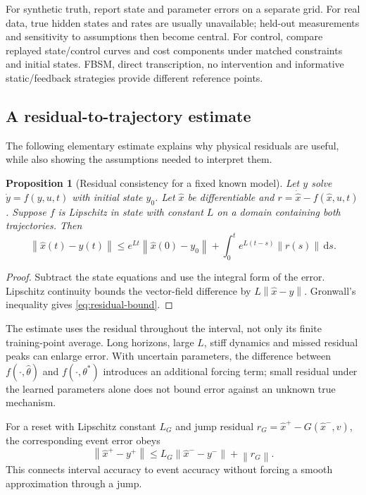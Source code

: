 \documentclass[11pt,a4paper]{article}
\newcommand{\dd}{\,\mathrm{d}}
\newcommand{\norm}[1]{\left\lVert#1\right\rVert}
\newtheorem{proposition}{Proposition}[section]
\theoremstyle{definition}
\theoremstyle{remark}
\begin{document}
For synthetic truth, report state and parameter errors on a separate grid. For real data, true hidden states and rates are usually unavailable; held-out measurements and sensitivity to assumptions then become central. For control, compare replayed state/control curves and cost components under matched constraints and initial states. FBSM, direct transcription, no intervention and informative static/feedback strategies provide different reference points.

\subsection{A residual-to-trajectory estimate}
The following elementary estimate explains why physical residuals are useful, while also showing the assumptions needed to interpret them.
\begin{proposition}[Residual consistency for a fixed known model]
Let $y$ solve $\dot y=f(y,u,t)$ with initial state $y_0$. Let $\hat x$ be differentiable and $r=\dot{\hat x}-f(\hat x,u,t)$. Suppose $f$ is Lipschitz in state with constant $L$ on a domain containing both trajectories. Then
\begin{equation}
\norm{\hat x(t)-y(t)}\le e^{Lt}\norm{\hat x(0)-y_0}
+\int_0^t e^{L(t-s)}\norm{r(s)}\dd s.
\label{eq:residual-bound}
\end{equation}
\end{proposition}
\begin{proof}
Subtract the state equations and use the integral form of the error. Lipschitz continuity bounds the vector-field difference by $L\norm{\hat x-y}$. Gronwall's inequality gives \eqref{eq:residual-bound}.
\end{proof}
The estimate uses the residual throughout the interval, not only its finite training-point average. Long horizons, large $L$, stiff dynamics and missed residual peaks can enlarge error. With uncertain parameters, the difference between $f(\cdot,\hat\theta)$ and $f(\cdot,\theta^*)$ introduces an additional forcing term; small residual under the learned parameters alone does not bound error against an unknown true mechanism.

For a reset with Lipschitz constant $L_G$ and jump residual $r_G=\hat x^+-G(\hat x^-,v)$, the corresponding event error obeys
\begin{equation}
\norm{\hat x^+-y^+}\le L_G\norm{\hat x^--y^-}+\norm{r_G}.
\end{equation}
This connects interval accuracy to event accuracy without forcing a smooth approximation through a jump.
\end{document}
